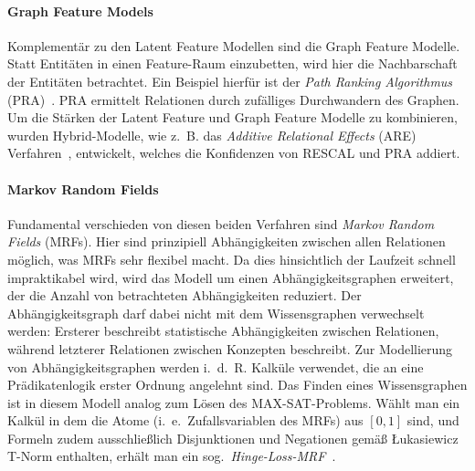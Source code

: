 \paragraph{Graph Feature Models}
Komplementär zu den Latent Feature Modellen sind die Graph Feature Modelle.
Statt Entitäten in einen Feature-Raum einzubetten, wird hier die Nachbarschaft der Entitäten betrachtet.
Ein Beispiel hierfür ist der \textit{Path Ranking Algorithmus} (PRA)~\cite{Lao2011}. PRA ermittelt Relationen durch zufälliges Durchwandern des Graphen.
Um die Stärken der Latent Feature und Graph Feature Modelle zu kombinieren, wurden Hybrid-Modelle, wie z.~B. das \textit{Additive Relational Effects} (ARE) Verfahren~\cite{Nickel2014}, entwickelt, welches die Konfidenzen von RESCAL und PRA addiert.

\paragraph{Markov Random Fields}
Fundamental verschieden von diesen beiden Verfahren sind \textit{Markov Random Fields} (MRFs).
Hier sind prinzipiell Abhängigkeiten zwischen allen Relationen möglich, was MRFs sehr flexibel macht.
Da dies hinsichtlich der Laufzeit schnell impraktikabel wird, wird das Modell um einen Abhängigkeitsgraphen erweitert, der die Anzahl von betrachteten Abhängigkeiten reduziert.
Der Abhängigkeitsgraph darf dabei nicht mit dem Wissensgraphen verwechselt werden:
Ersterer beschreibt statistische Abhängigkeiten zwischen Relationen, während letzterer Relationen zwischen Konzepten beschreibt.
Zur Modellierung von Abhängigkeitsgraphen werden i.~d.~R. Kalküle verwendet, die an eine Prädikatenlogik erster Ordnung angelehnt sind.
Das Finden eines Wissensgraphen ist in diesem Modell analog zum Lösen des MAX-SAT-Problems.
Wählt man ein Kalkül in dem die Atome (i.~e.\ Zufallsvariablen des MRFs) aus $[0, 1]$ sind, und Formeln zudem ausschließlich Disjunktionen und Negationen gemäß Łukasiewicz T-Norm enthalten, erhält man ein sog.\ \textit{Hinge-Loss-MRF}~\cite{Bach2013}\cite{Bach2015}.

